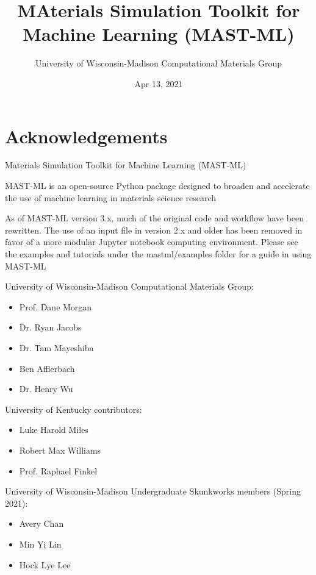\documentclass[letterpaper,10pt,english]{sphinxmanual}
\title{MAterials Simulation Toolkit for Machine Learning (MAST-ML)}
\date{Apr 13, 2021}
\author{University of Wisconsin-Madison Computational Materials Group}
\begin{document}
\pagestyle{empty}
\sphinxmaketitle
\pagestyle{plain}
\sphinxtableofcontents
\pagestyle{normal}
\label{\detokenize{index::doc}}



\chapter{Acknowledgements}
\label{\detokenize{00_acknowledgements:acknowledgements}}\label{\detokenize{00_acknowledgements::doc}}
Materials Simulation Toolkit for Machine Learning (MAST-ML)

MAST-ML is an open-source Python package designed to broaden and accelerate the use of machine learning in materials science research

As of MAST-ML version 3.x, much of the original code and workflow have been rewritten. The use of an input file in version 2.x and older
has been removed in favor of a more modular Jupyter notebook computing environment. Please see the examples and tutorials under
the mastml/examples folder for a guide in using MAST-ML


University of Wisconsin-Madison Computational Materials Group:
\begin{itemize}
\item {} 
Prof. Dane Morgan

\item {} 
Dr. Ryan Jacobs

\item {} 
Dr. Tam Mayeshiba

\item {} 
Ben Afflerbach

\item {} 
Dr. Henry Wu

\end{itemize}

University of Kentucky contributors:
\begin{itemize}
\item {} 
Luke Harold Miles

\item {} 
Robert Max Williams

\item {} 
Prof. Raphael Finkel

\end{itemize}

University of Wisconsin-Madison Undergraduate Skunkworks members (Spring 2021):
\begin{itemize}
\item {} 
Avery Chan

\item {} 
Min Yi Lin

\item {} 
Hock Lye Lee

\end{itemize}
\end{document}

